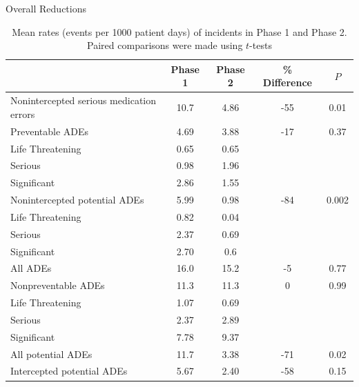 \documentclass[10pt]{beamer}
\begin{document}
\begin{frame}{Overall Reductions}
\begin{table}
	\scriptsize
	\begin{tabular}{l c c c c}
	& Phase 1 & Phase 2 & \% Difference & $P$  \\ \hline \hline
	Nonintercepted serious medication errors & 10.7 & 4.86 & -55 & 0.01 \\
	\quad Preventable ADEs & 4.69 & 3.88 & -17 & 0.37 \\
	\qquad Life Threatening & 0.65 & 0.65 \\ 
	\qquad Serious & 0.98 & 1.96 \\
	\qquad Significant & 2.86 & 1.55 \\	
	\quad Nonintercepted potential ADEs & 5.99 & 0.98 & -84 & 0.002 \\ 
	\qquad Life Threatening & 0.82 & 0.04 \\ 
	\qquad Serious & 2.37 & 0.69 \\
	\qquad Significant & 2.70 & 0.6 \\ \hline
	All ADEs & 16.0 & 15.2 & -5 & 0.77 \\
	\quad Nonpreventable ADEs & 11.3 & 11.3 & 0 & 0.99 \\ 
	\qquad Life Threatening & 1.07 & 0.69 \\ 
	\qquad Serious & 2.37 & 2.89 \\
	\qquad Significant & 7.78 & 9.37 \\ \hline
	All potential ADEs & 11.7 & 3.38 & -71 & 0.02 \\
	\quad Intercepted potential ADEs & 5.67 & 2.40 & -58 & 0.15 \\
	\end{tabular}
	\caption*{Mean rates (events per 1000 patient days) of incidents in Phase 1 and Phase 2. Paired comparisons were made using $t$-tests}
\end{table}
\end{frame}
\end{document}
